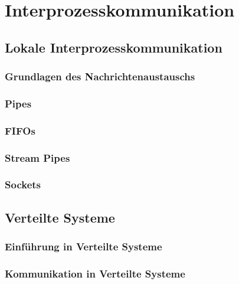 \documentclass{article}
\begin{document}
\newpage
\section{Interprozesskommunikation}
\subsection{Lokale Interprozesskommunikation}
\subsubsection{Grundlagen des Nachrichtenaustauschs}
\subsubsection{Pipes}
\subsubsection{FIFOs}
\subsubsection{Stream Pipes}
\subsubsection{Sockets}
\subsection{Verteilte Systeme}
\subsubsection{Einführung in Verteilte Systeme}
\subsubsection{Kommunikation in Verteilte Systeme}
\end{document}
